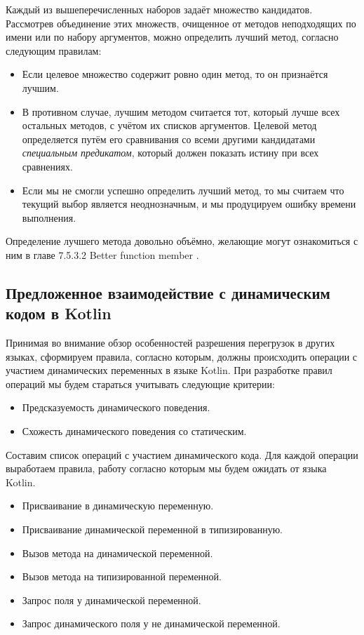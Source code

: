 Каждый из вышеперечисленных наборов задаёт множество кандидатов. Рассмотрев объединение этих множеств, очищенное от методов неподходящих по имени или по набору аргументов, можно определить лучший метод, согласно следующим правилам:

\begin{itemize}
    \item Если целевое множество содержит ровно один метод, то он признаётся лучшим.
    \item В противном случае, лучшим методом считается тот, который лучше всех остальных методов, с учётом их списков аргументов. Целевой метод определяется путём его сравнивания со всеми другими кандидатами \textit{специальным предикатом}, который должен показать истину при всех сравнениях.
    \item Если мы не смогли успешно определить лучший метод, то мы считаем что текущий выбор является неоднозначным, и мы продуцируем ошибку времени выполнения.
\end{itemize}

Определение лучшего метода довольно объёмно, желающие могут ознакомиться с ним в главе 7.5.3.2 Better function member \cite{csharp:languageSpecification}.


\subsection{Предложенное взаимодействие с динамическим кодом в Kotlin}

Принимая во внимание обзор особенностей разрешения перегрузок в других языках, сформируем правила, согласно которым, должны происходить операции с участием динамических переменных в языке Kotlin. При разработке правил операций мы будем стараться учитывать следующие критерии:

\begin{itemize}
    \item Предсказуемость динамического поведения.
    \item Схожесть динамического поведения со статическим.
\end{itemize}

Составим список операций с участием динамического кода. Для каждой операции выработаем правила, работу согласно которым мы будем ожидать от языка Kotlin.

\begin{itemize}
    \item Присваивание в динамическую переменную.
    \item Присваивание динамической переменной в типизированную.
    \item Вызов метода на динамической переменной.
    \item Вызов метода на типизированной переменной.
    \item Запрос поля у динамической переменной.
    \item Запрос динамического поля у не динамической переменной.
\end{itemize}

